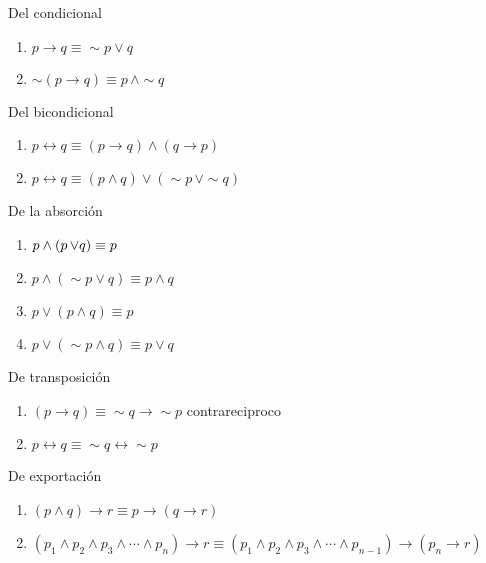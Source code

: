 \begin{ley}{Del condicional}
\begin{enumerate}
\item $p\rightarrow q\equiv\sim p\vee q$
\item $\sim\left(p\rightarrow q\right)\equiv p\,\wedge\sim q$
\end{enumerate}
\end{ley}

\begin{ley}{Del bicondicional}
\begin{enumerate}
\item $p\leftrightarrow q\equiv\left(p\rightarrow q\right)\wedge\left(q\rightarrow p\right)$
\item $p\leftrightarrow q\equiv\left(p\wedge q\right)\vee\left(\sim p\,\vee\sim q\right)$
\end{enumerate}
\end{ley}

\begin{ley}{De la absorción}
\begin{enumerate}
\item $p\wedge\left(p\text{\,\ensuremath{\vee}\ensuremath{q}}\right)\equiv p$
\item $p\wedge\left(\sim p\vee q\right)\equiv p\wedge q$
\item $p\vee\left(p\wedge q\right)\equiv p$
\item $p\vee\left(\sim p\wedge q\right)\equiv p\vee q$
\end{enumerate}
\end{ley}

\begin{ley}{De transposición}
\begin{enumerate}
\item $\left(p\rightarrow q\right)\equiv\sim q\rightarrow\sim p$ contrareciproco
\item $p\leftrightarrow q\equiv\sim q\leftrightarrow\sim p$
\end{enumerate}
\end{ley}

\begin{ley}{De exportación}
\begin{enumerate}
\item $\left(p\wedge q\right)\rightarrow r\equiv p\rightarrow\left(q\rightarrow r\right)$
\item $\left(p_{1}\wedge p_{2}\wedge p_{3}\wedge\cdots\wedge p_{n}\right)\rightarrow r\equiv\left(p_{1}\wedge p_{2}\wedge p_{3}\wedge\cdots\wedge p_{n-1}\right)\rightarrow\left(p_{n}\rightarrow r\right)$
\end{enumerate}
\end{ley}

